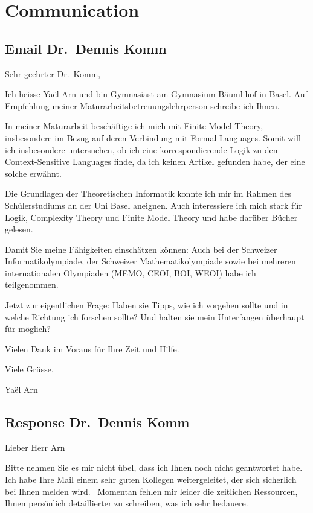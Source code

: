 \chapter{Communication}\label{sec:communications}


\section{Email Dr.~Dennis Komm}\label{email-dr.-dennis-komm}

Sehr geehrter Dr.~Komm,

Ich heisse Yaël Arn und bin Gymnasiast am Gymnasium Bäumlihof in Basel.
Auf Empfehlung meiner Maturarbeitsbetreuungslehrperson schreibe ich
Ihnen.

In meiner Maturarbeit beschäftige ich mich mit Finite Model Theory,
insbesondere im Bezug auf deren Verbindung mit Formal Languages. Somit
will ich insbesondere untersuchen, ob ich eine korrespondierende Logik
zu den Context-Sensitive Languages finde, da ich keinen Artikel gefunden
habe, der eine solche erwähnt.

Die Grundlagen der Theoretischen Informatik konnte ich mir im Rahmen des
Schülerstudiums an der Uni Basel aneignen. Auch interessiere ich mich
stark für Logik, Complexity Theory und Finite Model Theory und habe
darüber Bücher gelesen.

Damit Sie meine Fähigkeiten einschätzen können: Auch bei der Schweizer
Informatikolympiade, der Schweizer Mathematikolympiade sowie bei
mehreren internationalen Olympiaden (MEMO, CEOI, BOI, WEOI) habe ich
teilgenommen.

Jetzt zur eigentlichen Frage: Haben sie Tipps, wie ich vorgehen sollte
und in welche Richtung ich forschen sollte? Und halten sie mein
Unterfangen überhaupt für möglich?

Vielen Dank im Voraus für Ihre Zeit und Hilfe.

Viele Grüsse,

Yaël Arn


\section{Response Dr.~Dennis Komm}\label{response-dr.-dennis-komm}

Lieber Herr Arn

Bitte nehmen Sie es mir nicht übel, dass ich Ihnen noch nicht
geantwortet habe.~ Ich habe Ihre Mail einem sehr guten Kollegen
weitergeleitet, der sich sicherlich bei Ihnen melden wird.~ Momentan
fehlen mir leider die zeitlichen Ressourcen, Ihnen persönlich
detaillierter zu schreiben, was ich sehr bedauere.

